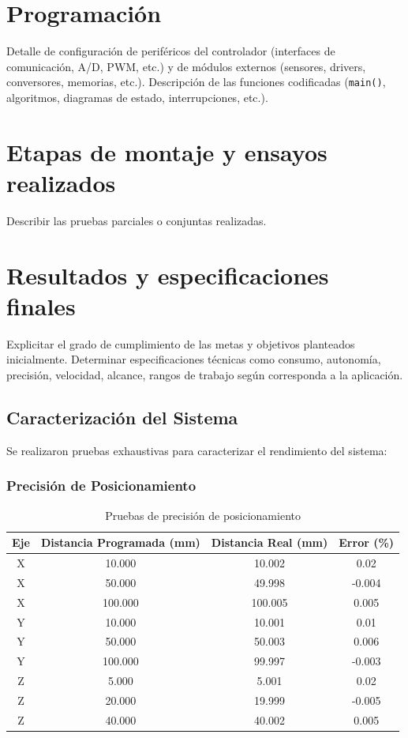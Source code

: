 \documentclass[12pt]{article}
\begin{document}

\section{Programación}
Detalle de configuración de periféricos del controlador (interfaces de comunicación, A/D, PWM, etc.) y de módulos externos (sensores, drivers, conversores, memorias, etc.).  
Descripción de las funciones codificadas (\texttt{main()}, algoritmos, diagramas de estado, interrupciones, etc.).

\section{Etapas de montaje y ensayos realizados}
Describir las pruebas parciales o conjuntas realizadas.

\section{Resultados y especificaciones finales}
Explicitar el grado de cumplimiento de las metas y objetivos planteados inicialmente.  
Determinar especificaciones técnicas como consumo, autonomía, precisión, velocidad, alcance, rangos de trabajo según corresponda a la aplicación.


\subsection{Caracterización del Sistema}

Se realizaron pruebas exhaustivas para caracterizar el rendimiento del sistema:

\subsubsection{Precisión de Posicionamiento}

\begin{table}[H]
\centering
\caption{Pruebas de precisión de posicionamiento}
\label{tab:precision}
\begin{tabular}{|c|c|c|c|}
\hline
\textbf{Eje} & \textbf{Distancia Programada (mm)} & \textbf{Distancia Real (mm)} & \textbf{Error (\%)} \\
\hline
X & 10.000 & 10.002 & 0.02 \\
X & 50.000 & 49.998 & -0.004 \\
X & 100.000 & 100.005 & 0.005 \\
\hline
Y & 10.000 & 10.001 & 0.01 \\
Y & 50.000 & 50.003 & 0.006 \\
Y & 100.000 & 99.997 & -0.003 \\
\hline
Z & 5.000 & 5.001 & 0.02 \\
Z & 20.000 & 19.999 & -0.005 \\
Z & 40.000 & 40.002 & 0.005 \\
\hline
\end{tabular}
\end{table}
\end{document}
